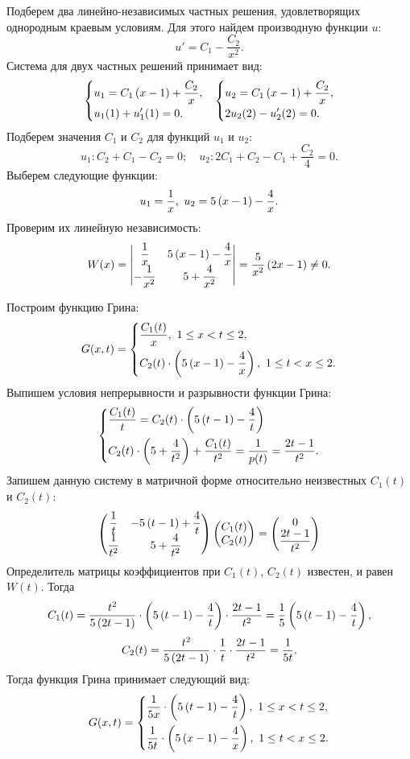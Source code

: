 		Подберем два линейно-независимых частных решения, удовлетворящих однородным краевым условиям. Для этого найдем производную функции $u$:
		\[ u' = C_1 - \frac{C_2}{x^2}. \]
		Система для двух частных решений принимает вид:
		\[ \begin{matrix}
			\left\lbrace \begin{aligned} &u_1 = C_1 \left( x - 1 \right) + \frac{C_2}{x}, \\ &u_1(1) + u_1'(1) = 0. \end{aligned} \right. & 
			\left\lbrace \begin{aligned} &u_2 = C_1 \left( x - 1 \right) + \frac{C_2}{x}, \\ &2u_2(2) - u_2'(2) = 0. \end{aligned} \right. 
		\end{matrix} \]
		Подберем значения $C_1$ и $C_2$ для функций $u_1$ и $u_2$:
		\[ u_1: C_2 + C_1 - C_2 = 0; \quad u_2: 2C_1 + C_2 - C_1 + \frac{C_2}4 = 0. \]
		Выберем следующие функции:
		\[ u_1 = \frac{1}{x}, ~ u_2 = 5 \left( x - 1 \right) - \frac{4}{x}. \]
		Проверим их линейную независимость:
		\[ W(x) = \begin{vmatrix} 
			\dfrac{1}{x} & 5 \left( x - 1 \right) - \dfrac{4}{x} \\
			-\dfrac{1}{x^2} & 5 + \dfrac{4}{x^2}
		\end{vmatrix} = \frac{5}{x^2} \left( 2x - 1 \right) \neq 0. \]

		Построим функцию Грина:
		\[ G(x, t) = \left\lbrace \begin{aligned} 
			& \frac{C_1(t)}{x}, ~ 1 \le x < t \le 2, \\
			& C_2(t) \cdot \left( 5 \left( x - 1 \right) - \frac{4}{x} \right), ~ 1 \le t < x \le 2.
		 \end{aligned} \right. \]
		Выпишем условия непрерывности и разрывности функции Грина:
		\[ \left\lbrace \begin{aligned} 
			& \frac{C_1(t)}{t} = C_2(t) \cdot \left( 5 \left( t - 1 \right) - \frac{4}{t} \right) \\
			& C_2(t) \cdot \left( 5 + \frac{4}{t^2} \right) + \frac{C_1(t)}{t^2} = \frac{1}{p(t)} = \frac{2t - 1}{t^2}.
		 \end{aligned} \right. \]
		Запишем данную систему в матричной форме относительно неизвестных $C_1(t)$ и $C_2(t)$:
		\[ \begin{pmatrix} 
			\dfrac{1}{t} & -5 \left( t - 1 \right) + \dfrac{4}{t} \\
			\dfrac{1}{t^2} & 5 + \dfrac{4}{t^2}
		\end{pmatrix} \begin{pmatrix} C_1(t) \\ C_2(t) \end{pmatrix} = \begin{pmatrix} 0 \\ \dfrac{2t - 1}{t^2} \end{pmatrix} \]
		Определитель матрицы коэффициентов при $C_1(t)$, $C_2(t)$ известен, и равен $W(t)$. Тогда
		\[ C_1(t) = \frac{t^2}{5\left( 2t - 1 \right)} \cdot \left( 5 \left( t - 1 \right) - \frac{4}{t} \right) \cdot \frac{2t - 1}{t^2} = \frac{1}{5} \left( 5 \left( t - 1 \right) - \frac{4}{t} \right), \] 
		\[ C_2(t) = \frac{t^2}{5\left( 2t - 1 \right)} \cdot \frac{1}{t} \cdot \frac{2t - 1}{t^2} = \frac{1}{5t}. \]
		Тогда функция Грина принимает следующий вид:
		\[ G(x, t) = \left\lbrace \begin{aligned} 
			& \frac{1}{5x} \cdot \left( 5 \left( t - 1 \right) - \frac{4}{t} \right), ~ 1 \le x < t \le 2, \\
			& \frac{1}{5t} \cdot \left( 5 \left( x - 1 \right) - \frac{4}{x} \right), ~ 1 \le t < x \le 2.
		 \end{aligned} \right. \] 

